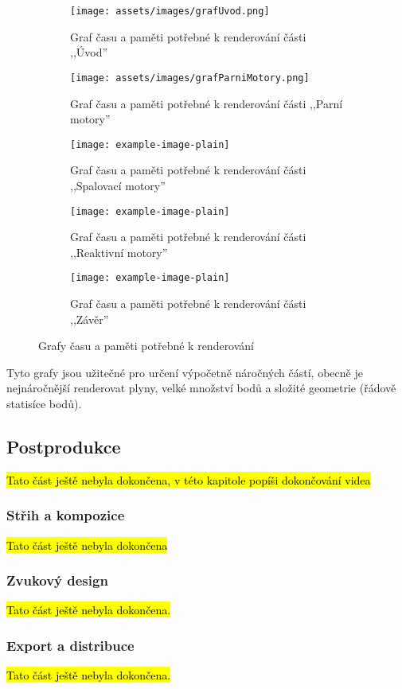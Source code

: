 \begin{figure}[H]
    \centering
    \begin{subfigure}{\textwidth}
        \centering
        \texttt{[image: assets/images/grafUvod.png]}
        \caption{Graf času a paměti potřebné k renderování části ,,Úvod'' \jaGraf}\vspace{0.25cm}
    \end{subfigure}
    \begin{subfigure}{\textwidth}
        \texttt{[image: assets/images/grafParniMotory.png]}
        \caption{Graf času a paměti potřebné k renderování části ,,Parní motory'' \jaGraf}\vspace{0.25cm}
    \end{subfigure}
    \begin{subfigure}{\textwidth}
        \texttt{[image: example-image-plain]}
        \caption{Graf času a paměti potřebné k renderování části ,,Spalovací motory'' \jaGraf}\vspace{0.25cm}
    \end{subfigure}
    \begin{subfigure}{\textwidth}
        \texttt{[image: example-image-plain]}
        \caption{Graf času a paměti potřebné k renderování části ,,Reaktivní motory'' \jaGraf}\vspace{0.25cm}
    \end{subfigure}
    \begin{subfigure}{\textwidth}
        \texttt{[image: example-image-plain]}
        \caption{Graf času a paměti potřebné k renderování části ,,Závěr'' \jaGraf}
    \end{subfigure}
    \caption{Grafy času a paměti potřebné k renderování}
    \label{obr:grafRender}
\end{figure}

{Tyto grafy jsou užitečné pro určení výpočetně náročných částí, obecně je nejnáročnější renderovat plyny, velké množství bodů a složité geometrie (řádově statisíce bodů).}

\newpage

\subsection{Postprodukce}
\hl{Tato část ještě nebyla dokončena, v této kapitole popíši dokončování videa}

\subsubsection{Střih a kompozice}
\hl{Tato část ještě nebyla dokončena}

\subsubsection{Zvukový design}
\hl{Tato část ještě nebyla dokončena.}

\subsubsection{Export a distribuce}
\hl{Tato část ještě nebyla dokončena.}